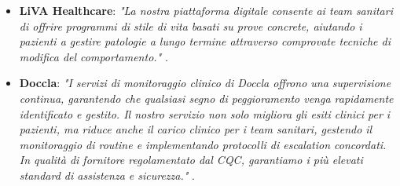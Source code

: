 \documentclass[12pt,a4paper,oneside]{report}
\begin{document}
\begin{itemize}
    \item \textbf{LiVA Healthcare}: \textit{"La nostra piattaforma digitale consente ai team sanitari di offrire programmi di stile di vita basati su prove concrete, aiutando i pazienti a gestire patologie a lungo termine attraverso comprovate tecniche di modifica del comportamento."} \cite{liva}.
    \item \textbf{Doccla}: \textit{"I servizi di monitoraggio clinico di Doccla offrono una supervisione continua, garantendo che qualsiasi segno di peggioramento venga rapidamente identificato e gestito. Il nostro servizio non solo migliora gli esiti clinici per i pazienti, ma riduce anche il carico clinico per i team sanitari, gestendo il monitoraggio di routine e implementando protocolli di escalation concordati. In qualità di fornitore regolamentato dal CQC, garantiamo i più elevati standard di assistenza e sicurezza."} \cite{doccla}.
\end{itemize}
\end{document}
